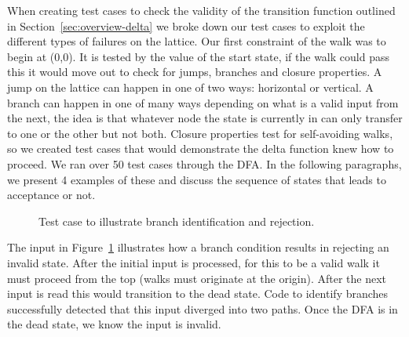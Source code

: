 When creating test cases to check the validity of the transition function outlined in Section~\ref{sec:overview-delta} we broke down our test cases to exploit the different types of failures on the lattice. Our first constraint of the walk was to begin at (0,0). It is tested by the value of the start state, if the walk could pass this it would move out to check for jumps, branches and closure properties. A jump on the lattice can happen in one of two ways: horizontal or vertical. A branch can happen in one of many ways depending on what is a valid input from the next, the idea is that whatever node the state is currently in can only transfer to one or the other but not both. Closure properties test for self-avoiding walks, so we created test cases that would demonstrate the delta function knew how to proceed. We ran over 50 test cases through the DFA. In the following paragraphs, we present 4 examples of these and discuss the sequence of states that leads to acceptance or not.

\begin{figure}[h!]
\begin{center}
\end{center}
\caption{Test case to illustrate branch identification and rejection.}
\label{fig:test-branch}
\end{figure}
The input in Figure~\ref{fig:test-branch} illustrates how a branch condition results in rejecting an invalid state. After the initial input is processed, for this to be a valid walk it must proceed from the top (walks must originate at the origin). After the next input is read this would transition to the dead state. Code to identify branches successfully detected that this input diverged into two paths. Once the DFA is in the dead state, we know the input is invalid.

